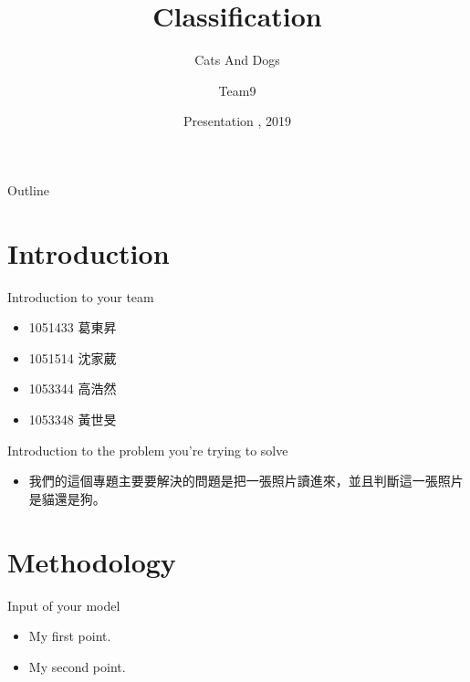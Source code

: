 \documentclass{beamer}
\title{Classification}
\subtitle{Cats And Dogs}
\author{Team9}
\date{Presentation , 2019}
\begin{document}
\begin{frame}
  \titlepage
\end{frame}

\begin{frame}{Outline}
  \tableofcontents
\end{frame}



\section{Introduction}


\begin{frame}{Introduction to your team}
\begin{CJK*}{UTF8}{bsmi}
  \begin{itemize}
  \item {
    1051433 葛東昇  
  }
  \item {
    1051514 沈家葳
  }
  \item {
    1053344 高浩然
  }
  \item {
    1053348 黃世旻
  }
  \end{itemize}
\end{CJK*}
\end{frame}

\begin{frame}{Introduction to the problem you're trying to solve  }
\begin{CJK*}{UTF8}{bsmi}
  \begin{itemize}
  \item {
    我們的這個專題主要要解決的問題是把一張照片讀進來，並且判斷這一張照片是貓還是狗。
  }
  \end{itemize}
\end{CJK*}
\end{frame}



\section{Methodology}

\begin{frame}{Input of your model }
  \begin{itemize}
  \item {
    My first point.
  }
  \item {
    My second point.
  }
  \end{itemize}
\end{frame}
\end{document}
